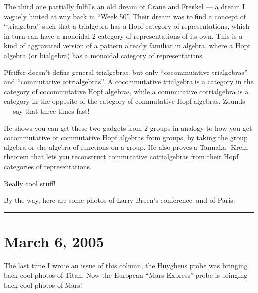 \documentclass{article}
\def\tightlist{}
\renewcommand{\texttt}[1]{%
  \begingroup
  \ttfamily
  \begingroup\lccode`~=`/\lowercase{\endgroup\def~}{/\discretionary{}{}{}}%
  \begingroup\lccode`~=`[\lowercase{\endgroup\def~}{[\discretionary{}{}{}}%
  \begingroup\lccode`~=`.\lowercase{\endgroup\def~}{.\discretionary{}{}{}}%
  \catcode`/=\active\catcode`[=\active\catcode`.=\active
  \scantokens{#1\noexpand}%
  \endgroup
}
\begin{document}
The third one partially fulfills an old dream of Crane and Frenkel --- a
dream I vaguely hinted at way back in \protect\hyperlink{week50}{``Week
50''}. Their dream was to find a concept of ``trialgebra'' such that a
trialgebra has a Hopf category of representations, which in turn can
have a monoidal \(2\)-category of representations of its own. This is a
kind of aggravated version of a pattern already familiar in algebra,
where a Hopf algebra (or bialgebra) has a monoidal category of
representations.

Pfeiffer doesn't define general trialgebras, but only ``cocommutative
trialgebras'' and ``commutative cotrialgebras''. A cocommutative
trialgebra is a category in the category of cocommutative Hopf algebras,
while a commutative cotrialgebra is a category in the opposite of the
category of commutative Hopf algebras. Zounds --- say that three times
fast!

He shows you can get these two gadgets from \(2\)-groups in analogy to
how you get cocommutative or commutative Hopf algebras from groups, by
taking the group algebra or the algebra of functions on a group. He also
proves a Tannaka- Krein theorem that lets you reconstruct commutative
cotrialgebras from their Hopf categories of representations.

Really cool stuff!

By the way, here are some photos of Larry Breen's conference, and of
Paris:


\begin{center}\rule{0.5\linewidth}{0.5pt}\end{center}



\hypertarget{week211}{%
\section{March 6, 2005}\label{week211}}

The last time I wrote an issue of this column, the Huyghens probe was
bringing back cool photos of Titan. Now the European ``Mars Express''
probe is bringing back cool photos of Mars!

\end{document}
